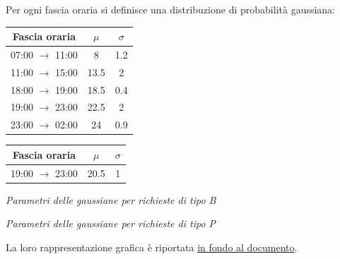 \documentclass[a4paper, 12pt]{article}
\begin{document}
Per ogni fascia oraria si definisce una distribuzione di probabilità gaussiana:\\

\begin{minipage}{0.5\textwidth}
\begin{table}[H]
\centering
\begin{tabular}{ |c|c|c| }
	\hline
    \cellcolor{cellcolor} Fascia oraria & \cellcolor{cellcolor}$\mu$ & \cellcolor{cellcolor}$\sigma$\\
	\hline
    \hline

  	07:00 $\rightarrow$ 11:00 & 8 & 1.2 \\
    \hline	
	
	11:00 $\rightarrow$ 15:00 & 13.5 & 2 \\
    \hline
  
	18:00 $\rightarrow$ 19:00 & 18.5 & 0.4 \\  
    \hline
    
	19:00 $\rightarrow$ 23:00 & 22.5 & 2\\
    \hline
    
    23:00 $\rightarrow$ 02:00 & 24 & 0.9 \\
    \hline        
\end{tabular}
\end{table}
\end{minipage}
\begin{minipage}{0.5\textwidth}
\begin{table}[H]
\centering
\begin{tabular}{ |c|c|c| }
	\hline
    \cellcolor{cellcolor} Fascia oraria & \cellcolor{cellcolor}$\mu$ & \cellcolor{cellcolor}$\sigma$\\
	\hline
    \hline
    19:00 $\rightarrow$ 23:00 & 20.5 & 1\\
    \hline
\end{tabular}
\end{table}
\end{minipage}
\bigskip

\begin{minipage}{0.4\textwidth}
\centering
\textit{Parametri delle gaussiane per richieste di tipo B}
\end{minipage}
\hspace{0.2\textwidth}
\begin{minipage}{0.4\textwidth}
\centering
\textit{Parametri delle gaussiane per richieste di tipo P}
\end{minipage}
\bigskip

La loro rappresentazione grafica è riportata \hyperlink{rappresentazione grafica gaussiane}{in fondo al documento}. 
\bigskip
\end{document}
